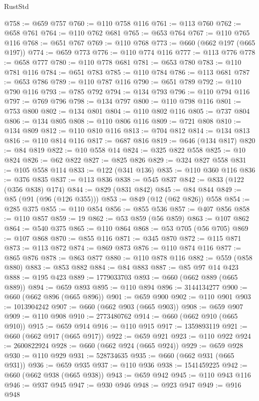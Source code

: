 \begin{lexlean}{RustStd}
\begin{coremodule}
{\begin{coremodule}
{{{{{{{{{{{{{{{{{{{{{{{{{{{{{{{{{{{{{{{{{{{{{{{@758 := @659 @757
@760 := @110 @758 @116
@761 := @113 @760
@762 := @658 @761
@764 := @110 @762 @681
@765 := @653 @764
@767 := @110 @765 @116
@768 := @651 @767
@769 := @110 @768
@773 := @660 (@662 @197 (@665 @197))
@774 := @659 @773
@776 := @110 @774 @116
@777 := @113 @776
@778 := @658 @777
@780 := @110 @778 @681
@781 := @653 @780
@783 := @110 @781 @116
@784 := @651 @783
@785 := @110 @784
@786 := @113 @681
@787 := @653 @786
@789 := @110 @787 @116
@790 := @651 @789
@792 := @110 @790 @116
@793 := @785 @792
@794 := @134 @793
@796 := @110 @794 @116
@797 := @769 @796
@798 := @134 @797
@800 := @110 @798 @116
@801 := @753 @800
@802 := @134 @801
@804 := @110 @802 @116
@805 := @737 @804
@806 := @134 @805
@808 := @110 @806 @116
@809 := @721 @808
@810 := @134 @809
@812 := @110 @810 @116
@813 := @704 @812
@814 := @134 @813
@816 := @110 @814 @116
@817 := @687 @816
@819 := @646 (@134 @817)
@820 := @84 @819
@822 := @10 @558 @14
@824 := @325 @822 @558
@825 := @10 @824
@826 := @62 @822
@827 := @825 @826
@829 := @324 @827 @558
@831 := @105 @558 @114
@833 := @122 (@341 @136)
@835 := @110 @360 @116
@836 := @376 @835
@837 := @113 @836
@838 := @545 @837
@842 := @833 (@122 (@356 @838) @174)
@844 := @829 (@831 @842)
@845 := @84 @844
@849 := @85 (@91 (@96 (@126 @355)))
@853 := @849 (@12 (@62 @826)) @558
@854 := @285 @375
@855 := @110 @854
@856 := @855 @536
@857 := @407 @856
@858 := @110 @857
@859 := 19
@862 := @53 @859 (@56 @859)
@863 := @107 @862
@864 := @540 @375
@865 := @110 @864
@868 := @53 @705 (@56 @705)
@869 := @107 @868
@870 := @855 @116
@871 := @345 @870
@872 := @115 @871
@873 := @113 @872
@874 := @869 @873
@876 := @110 @874 @116
@877 := @865 @876
@878 := @863 @877
@880 := @110 @878 @116
@882 := @559 (@858 @880)
@883 := @853 @882
@884 := @84 @883
@887 := @85 @97 @14 @423
@888 := @195 @423
@889 := 1779033703
@893 := @660 (@662 @889 (@665 @889))
@894 := @659 @893
@895 := @110 @894
@896 := 3144134277
@900 := @660 (@662 @896 (@665 @896))
@901 := @659 @900
@902 := @110 @901
@903 := 1013904242
@907 := @660 (@662 @903 (@665 @903))
@908 := @659 @907
@909 := @110 @908
@910 := 2773480762
@914 := @660 (@662 @910 (@665 @910))
@915 := @659 @914
@916 := @110 @915
@917 := 1359893119
@921 := @660 (@662 @917 (@665 @917))
@922 := @659 @921
@923 := @110 @922
@924 := 2600822924
@928 := @660 (@662 @924 (@665 @924))
@929 := @659 @928
@930 := @110 @929
@931 := 528734635
@935 := @660 (@662 @931 (@665 @931))
@936 := @659 @935
@937 := @110 @936
@938 := 1541459225
@942 := @660 (@662 @938 (@665 @938))
@943 := @659 @942
@945 := @110 @943 @116
@946 := @937 @945
@947 := @930 @946
@948 := @923 @947
@949 := @916 @948
}}}}}}}}}}}}}}}}}}}}}}}}}}}}}}}}}}}}}}}}}}}}}}}
\end{coremodule}}
\end{coremodule}
\end{lexlean}
